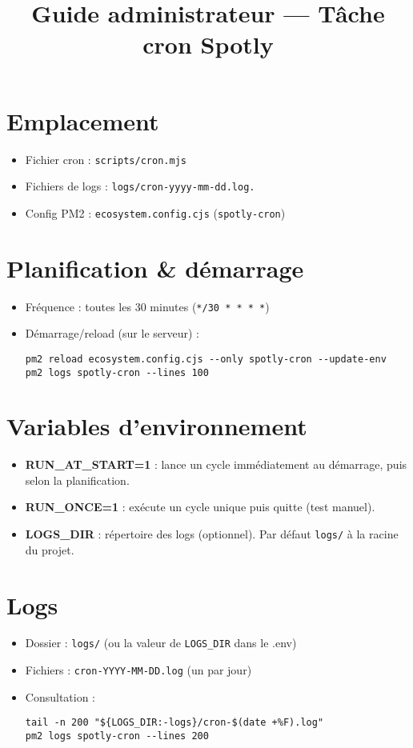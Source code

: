 \documentclass{article}
\title{Guide administrateur — Tâche cron Spotly}
\date{}
\begin{document}
\maketitle

\section*{Emplacement}
\begin{itemize}[leftmargin=1.2em]
  \item Fichier cron : \texttt{scripts/cron.mjs}
  \item Fichiers de logs : \texttt{logs/cron-yyyy-mm-dd.log.}
  \item Config PM2 : \texttt{ecosystem.config.cjs} (\texttt{spotly-cron})
\end{itemize}

\section*{Planification \& démarrage}
\begin{itemize}[leftmargin=1.2em]
  \item Fréquence : toutes les 30 minutes (\texttt{*/30 * * * *})
  \item Démarrage/reload (sur le serveur) :
\begin{verbatim}
pm2 reload ecosystem.config.cjs --only spotly-cron --update-env
pm2 logs spotly-cron --lines 100
\end{verbatim}
\end{itemize}

\section*{Variables d'environnement}
\begin{itemize}[leftmargin=1.2em]
  \item \textbf{RUN\_AT\_START=1} : lance un cycle immédiatement au démarrage, puis selon la planification.
  \item \textbf{RUN\_ONCE=1} : exécute un cycle unique puis quitte (test manuel).
  \item \textbf{LOGS\_DIR} : répertoire des logs (optionnel). Par défaut \texttt{logs/} à la racine du projet.
\end{itemize}

\section*{Logs}
\begin{itemize}[leftmargin=1.2em]
  \item Dossier : \texttt{logs/} (ou la valeur de \texttt{LOGS\_DIR} dans le .env)
  \item Fichiers : \texttt{cron-YYYY-MM-DD.log} (un par jour)
  \item Consultation :
\begin{verbatim}
tail -n 200 "${LOGS_DIR:-logs}/cron-$(date +%F).log"
pm2 logs spotly-cron --lines 200
\end{verbatim}
\end{itemize}
\end{document}
